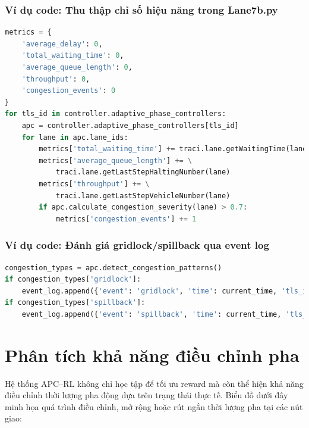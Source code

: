 \subsubsection*{Ví dụ code: Thu thập chỉ số hiệu năng trong Lane7b.py}
\begin{lstlisting}[language=Python, caption={Thu thập chỉ số hiệu năng trong Lane7b.py}, basicstyle=\ttfamily\footnotesize, xleftmargin=0.5cm, breaklines=true]
metrics = {
    'average_delay': 0,
    'total_waiting_time': 0,
    'average_queue_length': 0,
    'throughput': 0,
    'congestion_events': 0
}
for tls_id in controller.adaptive_phase_controllers:
    apc = controller.adaptive_phase_controllers[tls_id]
    for lane in apc.lane_ids:
        metrics['total_waiting_time'] += traci.lane.getWaitingTime(lane)
        metrics['average_queue_length'] += \
            traci.lane.getLastStepHaltingNumber(lane)
        metrics['throughput'] += \
            traci.lane.getLastStepVehicleNumber(lane)
        if apc.calculate_congestion_severity(lane) > 0.7:
            metrics['congestion_events'] += 1
\end{lstlisting}

\subsubsection*{Ví dụ code: Đánh giá gridlock/spillback qua event log}
\begin{lstlisting}[language=Python, caption={Đánh giá gridlock/spillback qua event log}, basicstyle=\ttfamily\footnotesize, xleftmargin=0.5cm, breaklines=true]
congestion_types = apc.detect_congestion_patterns()
if congestion_types['gridlock']:
    event_log.append({'event': 'gridlock', 'time': current_time, 'tls_id': apc.tls_id})
if congestion_types['spillback']:
    event_log.append({'event': 'spillback', 'time': current_time, 'tls_id': apc.tls_id})
\end{lstlisting}

\section{Phân tích khả năng điều chỉnh pha}

Hệ thống APC–RL không chỉ học tập để tối ưu reward mà còn thể hiện khả năng điều chỉnh thời lượng pha động dựa trên trạng thái thực tế. Biểu đồ dưới đây minh họa quá trình điều chỉnh, mở rộng hoặc rút ngắn thời lượng pha tại các nút giao:

